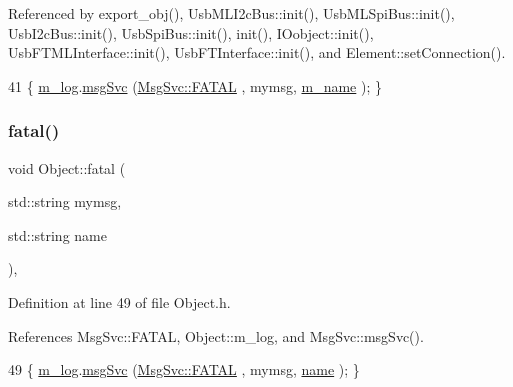 Referenced by export\+\_\+obj(), Usb\+M\+L\+I2c\+Bus\+::init(), Usb\+M\+L\+Spi\+Bus\+::init(), Usb\+I2c\+Bus\+::init(), Usb\+Spi\+Bus\+::init(), init(), I\+Oobject\+::init(), Usb\+F\+T\+M\+L\+Interface\+::init(), Usb\+F\+T\+Interface\+::init(), and Element\+::set\+Connection().


\begin{DoxyCode}
41 \{ \hyperlink{classObject_a0d269813dd7ac1f24bc143031e2963f2}{m\_log}.\hyperlink{classMsgSvc_ad25f18047920cc59a314e5098259711c}{msgSvc} (\hyperlink{classMsgSvc_ae671eb7301996cd049d2da8a65925926a59c73cb29edfc9cdf35845e2b1301363}{MsgSvc::FATAL}   , mymsg, \hyperlink{classObject_a8b83c95c705d2c3ba0d081fe1710f48d}{m\_name} ); \}
\end{DoxyCode}
\mbox{\label{classObject_ae62acd3d09f716220f75f252dc38bc9a}} 
\subsubsection{\texorpdfstring{fatal()}{fatal()}\hspace{0.1cm}{\footnotesize\ttfamily [2/2]}}
{\footnotesize\ttfamily void Object\+::fatal (\begin{DoxyParamCaption}\item[{std\+::string}]{mymsg,  }\item[{std\+::string}]{name }\end{DoxyParamCaption})\hspace{0.3cm}{\ttfamily [inline]}, {\ttfamily [inherited]}}



Definition at line 49 of file Object.\+h.



References Msg\+Svc\+::\+F\+A\+T\+AL, Object\+::m\+\_\+log, and Msg\+Svc\+::msg\+Svc().


\begin{DoxyCode}
49 \{ \hyperlink{classObject_a0d269813dd7ac1f24bc143031e2963f2}{m\_log}.\hyperlink{classMsgSvc_ad25f18047920cc59a314e5098259711c}{msgSvc} (\hyperlink{classMsgSvc_ae671eb7301996cd049d2da8a65925926a59c73cb29edfc9cdf35845e2b1301363}{MsgSvc::FATAL}   , mymsg, \hyperlink{classObject_a300f4c05dd468c7bb8b3c968868443c1}{name} ); \}
\end{DoxyCode}
\mbox{\label{classHierarchy_a255174fe4d316d2a3f430dcb9dab29f1}} 
